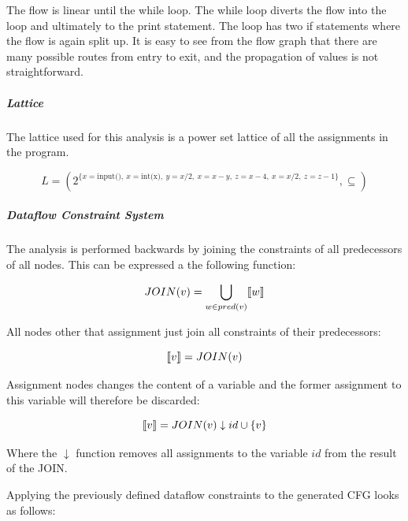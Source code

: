 The flow is linear until the while loop.
The while loop diverts the flow into the loop and ultimately to the print statement.
The loop has two if statements where the flow is again split up.
It is easy to see from the flow graph that there are many possible routes from entry to exit, and the propagation of values is not straightforward.

\subparagraph{Lattice}
The lattice used for this analysis is a power set lattice of all the assignments in the program.

\[ L = ( 2^{ \{x = \text{input()}, ~ x = \text{int(x)}, ~ y = x/2, ~ x = x-y, ~ z = x-4, ~ x = x/2, ~ z = z-1 \} } , \subseteq ) \]


\subparagraph{Dataflow Constraint System}
The analysis is performed backwards by joining the constraints of all predecessors of all nodes.
This can be expressed a the following function:

\[ JOIN(v) = \bigcup_{ w \in pred(v)} \llbracket w \rrbracket \]

All nodes other that assignment just join all constraints of their predecessors:

\[ \llbracket v \rrbracket = JOIN(v) \]

Assignment nodes changes the content of a variable and the former assignment to this variable will therefore be discarded:

\[ \llbracket v \rrbracket = JOIN(v) \downarrow id \cup \{ v \} \]

Where the $\downarrow$ function removes all assignments to the variable $id$ from the result of the JOIN.

Applying the previously defined dataflow constraints to the generated CFG looks as follows:

